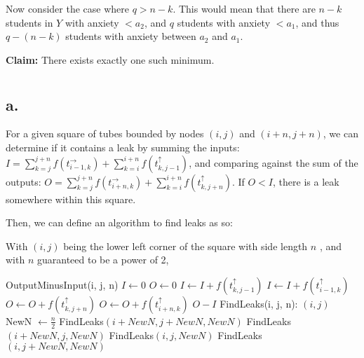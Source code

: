 \documentclass[11pt]{article}
\begin{document}
Now consider the case where $q > n-k$. This would mean that there are $n-k$ students in $Y$ with anxiety $< a_2$, and $q$ students with anxiety $< a_1$, and thus $q - (n - k)$ students with anxiety between $a_2$ and $a_1$.   


\textbf{Claim: } There exists exactly one such minimum.

\section{}
\subsection*{a.}
For a given square of tubes bounded by nodes $(i, j)$ and $(i+n, j+n)$, we can determine if it contains a leak by summing the inputs: $I = \sum_{k=j}^{j+n} f(t^{\rightarrow}_{i-1,k}) + \sum_{k=i}^{i+n} f(t^{\uparrow}_{k,j-1})$, and comparing against the sum of the outputs: $O = \sum_{k=j}^{j+n} f(t^{\rightarrow}_{i+n,k}) + \sum_{k=i}^{i+n} f(t^{\uparrow}_{k, j+n})$. If $O < I$, there is a leak somewhere within this square.

Then, we can define an algorithm to find leaks as so:

With $(i, j)$ being the lower left corner of the square with side length $n$ , and with $n$ guaranteed to be a power of 2,
\begin{algorithmic}
    \State OutputMinusInput(i, j, n)
        \State $I \gets 0$
        \State $O \gets 0$
            \State $I \gets I + f(t^{\uparrow}_{k, j-1})$
        \EndFor
            \State $I \gets I + f(t^{\uparrow}_{i-1, k})$
        \EndFor
            \State $O \gets O + f(t^{\uparrow}_{k, j+n})$
        \EndFor
            \State $O \gets O + f(t^{\uparrow}_{i+n, k})$
        \EndFor
        \State \Return $O - I$
    \State FindLeaks(i, j, n):
         
            \State \Return $(i, j)$
        \Else
            \State NewN $\gets \frac{n}{2}$
             
                \State \Return FindLeaks$(i + NewN, j + NewN, NewN)$
             
                \State \Return FindLeaks$(i + NewN, j, NewN)$
             
                \State \Return FindLeaks$(i, j, NewN)$
             
                \State \Return FindLeaks$(i, j + NewN, NewN)$
            \EndIf
        \EndIf
\end{algorithmic}
\end{document}
